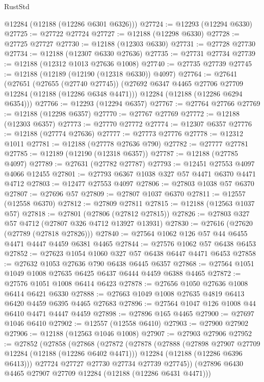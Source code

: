 \begin{lexlean}{RustStd}
\begin{coremodule}
      @12284
      (@12188 (@12286 @6301 @6326)))
@27724 := @12293 (@12294 @6330)
@27725 := @27722 @27724
@27727 := @12188 (@12298 @6330)
@27728 := @27725 @27727
@27730 := @12188 (@12303 @6330)
@27731 := @27728 @27730
@27734 := @12188 (@12307 @6330 @27636)
@27735 := @27731 @27734
@27739 := @12188 (@12312 @1013 @27636 @1008)
@27740 := @27735 @27739
@27745 := @12188 (@12189 (@12190 (@12318 @6330)) @4097)
@27764 := @27641
    (@27651
      (@27655 (@27740 @27745))
      (@27692 @6347 @4465 @27706 @27709 @12284 (@12188 (@12286 @6348 @4471)))
      @12284
      (@12188 (@12286 @6294 @6354)))
@27766 := @12293 (@12294 @6357)
@27767 := @27764 @27766
@27769 := @12188 (@12298 @6357)
@27770 := @27767 @27769
@27772 := @12188 (@12303 @6357)
@27773 := @27770 @27772
@27774 := @12307 @6357
@27776 := @12188 (@27774 @27636)
@27777 := @27773 @27776
@27778 := @12312 @1011
@27781 := @12188 (@27778 @27636 @790)
@27782 := @27777 @27781
@27785 := @12189 (@12190 (@12318 @6357))
@27787 := @12188 (@27785 @4097)
@27789 := @27631 (@27782 @27787)
@27793 := @12451 @27553 @4097 @4066 @12455
@27801 := @27793 @6367 @1038 @327 @57 @4471 @6370 @4471 @4712
@27803 := @12477 @27553 @4097
@27806 := @27803 @1038 @57 @6370
@27807 := @27696 @57
@27809 := @27807 @1037 @6370
@27811 := @12557 (@12558 @6370)
@27812 := @27809 @27811
@27815 := @12188 (@12563 @1037 @57)
@27818 := @27801 (@27806 (@27812 @27815))
@27826 := @27803 @327 @57 @4712 (@27807 @326 @4712 @13927 @13931)
@27830 := @27616 (@27620 (@27789 (@27818 @27826)))
@27840 := @27564 @1062 @126 @57 @44 @6455 @4471 @4447 @4459 @6381 @4465
@27844 := @27576 @1062 @57 @6438 @6453
@27852 := @27623 @1054 @1060 @327 @57 @6438 @6447 @4471 @6453
@27858 := @27632 @1053 @27636 @790 @6438 @6445 @6357
@27868 := @27564 @1051 @1049 @1008 @27635 @6425 @6437 @6444 @4459 @6388 @4465
@27872 := @27576 @1051 @1008 @6414 @6423
@27878 := @27656 @1050 @27636 @1008 @6414 @6421 @6330
@27888 := @27663 @1049 @1008 @27635 @4819 @6413 @6420 @4459 @6395 @4465 @27683
@27896 := @27564 @1047 @126 @1008 @44 @6410 @4471 @4447 @4459
@27898 := @27896 @165 @4465
@27900 := @27697 @1046 @6410
@27902 := @12557 (@12558 @6410)
@27903 := @27900 @27902
@27906 := @12188 (@12563 @1046 @1008)
@27907 := @27903 @27906
@27952 := @27852
    (@27858
      (@27868
        (@27872
          (@27878
            (@27888
              (@27898 @27907 @27709 @12284 (@12188 (@12286 @6402 @4471)))
              @12284
              (@12188 (@12286 @6396 @6413)))
            @27724
            @27727
            @27730
            @27734
            @27739
            @27745))
        (@27896 @6430 @4465 @27907 @27709 @12284 (@12188 (@12286 @6431 @4471)))

\end{coremodule}
\end{lexlean}
